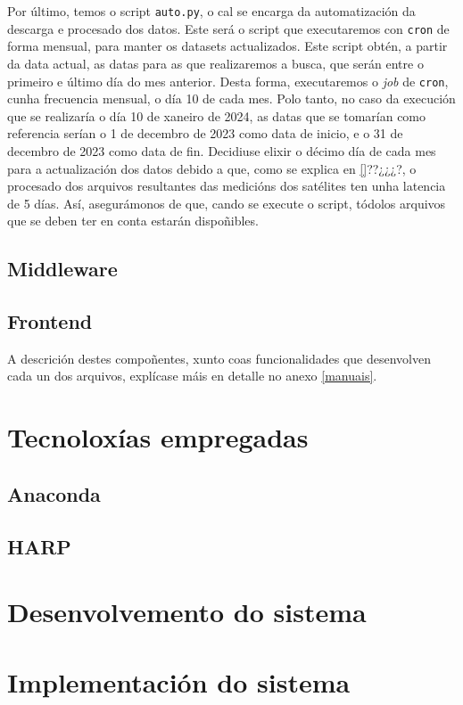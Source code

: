 Por último, temos o script \texttt{auto.py}, o cal se encarga da automatización da descarga e procesado dos datos. Este será o script que executaremos con \texttt{cron} de forma mensual,
para manter os datasets actualizados. Este script obtén, a partir da data actual, as datas para as que realizaremos a busca, que serán entre o primeiro e último día do mes anterior. Desta
forma, executaremos o \textit{job} de \texttt{cron}, cunha frecuencia mensual, o día 10 de cada mes. Polo tanto, no caso da execución que se realizaría o día 10 de xaneiro de 2024, as
datas que se tomarían como referencia serían o 1 de decembro de 2023 como data de inicio, e o 31 de decembro de 2023 como data de fin. Decidiuse elixir o décimo día de cada mes para
a actualización dos datos debido a que, como se explica en \ref{}??¿¿¿?, o procesado dos arquivos resultantes das medicións dos satélites ten unha latencia de 5 días. Así, asegurámonos
de que, cando se execute o script, tódolos arquivos que se deben ter en conta estarán dispoñibles.

\subsection{Middleware}\label{middleware}

\subsection{Frontend}\label{frontend}
A descrición destes compoñentes, xunto coas funcionalidades que desenvolven cada un dos arquivos, explícase máis en detalle no anexo \ref{manuais}.

\section{Tecnoloxías empregadas}\label{tecnoloxias}
\subsection{Anaconda}\label{anaconda}

\subsection{HARP}\label{harp}

\section{Desenvolvemento do sistema}\label{desenvolvemento}

\section{Implementación do sistema}\label{implementacion}